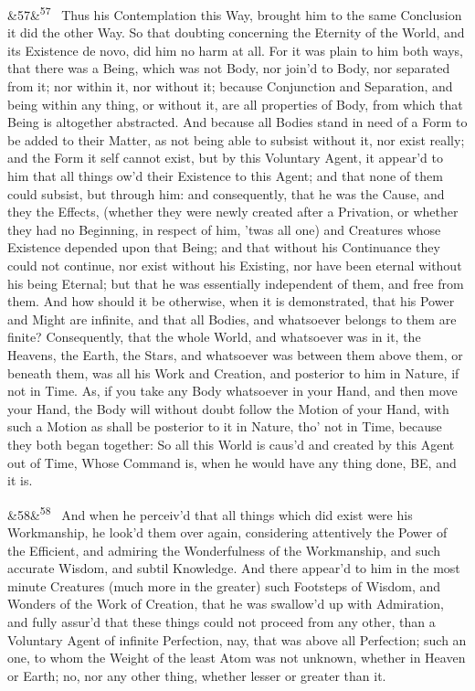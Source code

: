 \documentclass[12pt]{article}
\newcommand{\para}[1][]{\par\noindent\ifx&#1&\else\textsuperscript{\footnotesize #1}~\fi}
\begin{document}
\para[57] Thus his Contemplation this Way, brought him to the same Conclusion it did the other Way. So that doubting concerning the Eternity of the World, and its Existence de novo, did him no harm at all. For it was plain to him both ways, that there was a Being, which was not Body, nor join'd to Body, nor separated from it; nor within it, nor without it; because Conjunction and Separation, and being within any thing, or without it, are all properties of Body, from which that Being is altogether abstracted. And because all Bodies stand in need of a Form to be added to their Matter, as not being able to subsist without it, nor exist really; and the Form it self cannot exist, but by this Voluntary Agent, it appear'd to him that all things ow'd their Existence to this Agent; and that none of them could subsist, but through him: and consequently, that he was the Cause, and they the Effects, (whether they were newly created after a Privation, or whether they had no Beginning, in respect of him, 'twas all one) and Creatures whose Existence depended upon that Being; and that without his Continuance they could not continue, nor exist without his Existing, nor have been eternal without his being Eternal; but that he was essentially independent of them, and free from them. And how should it be otherwise, when it is demonstrated, that his Power and Might are infinite, and that all Bodies, and whatsoever belongs to them are finite? Consequently, that the whole World, and whatsoever was in it, the Heavens, the Earth, the Stars, and whatsoever was between them above them, or beneath them, was all his Work and Creation, and posterior to him in Nature, if not in Time. As, if you take any Body whatsoever in your Hand, and then move your Hand, the Body will without doubt follow the Motion of your Hand, with such a Motion as shall be posterior to it in Nature, tho' not in Time, because they both began together: So all this World is caus'd and created by this Agent out of Time, Whose Command is, when he would have any thing done, BE, and it is.

\para[58] And when he perceiv'd that all things which did exist were his Workmanship, he look'd them over again, considering attentively the Power of the Efficient, and admiring the Wonderfulness of the Workmanship, and such accurate Wisdom, and subtil Knowledge. And there appear'd to him in the most minute Creatures (much more in the greater) such Footsteps of Wisdom, and Wonders of the Work of Creation, that he was swallow'd up with Admiration, and fully assur'd that these things could not proceed from any other, than a Voluntary Agent of infinite Perfection, nay, that was above all Perfection; such an one, to whom the Weight of the least Atom was not unknown, whether in Heaven or Earth; no, nor any other thing, whether lesser or greater than it.
\end{document}
